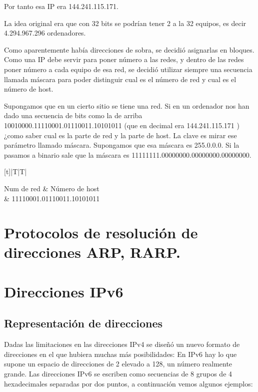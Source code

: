 \documentclass[letterpaper,10pt,spanish]{sphinxmanual}
\begin{document}
Por tanto esa IP era 144.241.115.171.

La idea original era que con 32 bits se podrían tener 2 a la 32 equipos, es decir 4.294.967.296 ordenadores.

Como aparentemente había direcciones de sobra, se decidió asignarlas en bloques. Como una IP debe servir para poner número a las redes, y dentro de las redes poner número a cada equipo de esa red, se decidió utilizar siempre una secuencia llamada máscara para poder distinguir cual es el número de red y cual es el número de host.

Supongamos que en un cierto sitio se tiene una red. Si en un ordenador nos han dado una secuencia de bits como la de arriba 10010000.11110001.01110011.10101011 (que en decimal era 144.241.115.171 ) ¿como saber cual es la parte de red y la parte de host. La clave es mirar ese parámetro llamado máscara. Supongamos que esa máscara es 255.0.0.0. Si la pasamos a binario sale que la máscara es 11111111.00000000.00000000.00000000.


\begin{savenotes}\sphinxattablestart
\centering
\begin{tabulary}{\linewidth}[t]{|T|T|}
\hline

Num de red
&
Número de host
\\
&
11110001.01110011.10101011
\\
\hline
\end{tabulary}
\par
\sphinxattableend\end{savenotes}


\section{Protocolos de resolución de direcciones ARP, RARP.}
\label{\detokenize{t2_integracion_elementos/apuntes_t2:protocolos-de-resolucion-de-direcciones-arp-rarp}}

\section{Direcciones IPv6}
\label{\detokenize{t2_integracion_elementos/apuntes_t2:direcciones-ipv6}}

\subsection{Representación de direcciones}
\label{\detokenize{t2_integracion_elementos/apuntes_t2:representacion-de-direcciones}}
Dadas las limitaciones en las direcciones IPv4 se diseñó un nuevo formato de direcciones en el que hubiera muchas más posibilidades:  En IPv6 hay  lo que supone un espacio de direcciones de 2 elevado a 128, un número realmente grande. Las direcciones IPv6 se escriben como secuencias de 8 grupos de 4 hexadecimales separadas por dos puntos, a continuación vemos algunos ejemplos:
\end{document}
